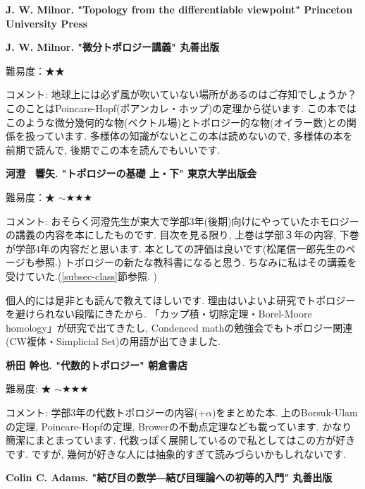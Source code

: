 \textbf{J. W. Milnor. "Topology from the differentiable viewpoint" Princeton University Press}  　\vspace{-6pt} 

\textbf{J. W. Milnor. "微分トポロジー講義" 丸善出版}  　\vspace{-6pt} 

難易度：★★ \vspace{-6pt} 

コメント: 地球上には必ず風が吹いていない場所があるのはご存知でしょうか？ このことはPoincare-Hopf(ポアンカレ・ホップ)の定理から従います. この本ではこのような微分幾何的な物(ベクトル場)とトポロジー的な物(オイラー数)との関係を扱っています. 多様体の知識がないとこの本は読めないので, 多様体の本を前期で読んで, 後期でこの本を読んでもいいです. 
\vspace{8pt}


\textbf{河澄　響矢. "トポロジーの基礎 上・下" 東京大学出版会}  　\vspace{-6pt} 

難易度：★ $\sim$★★★\vspace{-6pt} 

コメント: おそらく河澄先生が東大で学部3年(後期)向けにやっていたホモロジーの講義の内容を本にしたものです. 目次を見る限り, 上巻は学部３年の内容, 下巻が学部4年の内容だと思います. 本としての評価は良いです(松尾信一郎先生のページも参照.) トポロジーの新たな教科書になると思う. ちなみに私はその講義を受けていた.(\ref{subsec-class}節参照. )

個人的には是非とも読んで教えてほしいです. 理由はいよいよ研究でトポロジーを避けられない段階にきたから. 「カップ積・切除定理・Borel-Moore homology」が研究で出てきたし, Condenced mathの勉強会でもトポロジー関連(CW複体・Simplicial Set)の用語が出てきました. 
\vspace{8pt}

\textbf{枡田 幹也. "代数的トポロジー" 朝倉書店}  　\vspace{-6pt} 

難易度: ★ $\sim$★★★\vspace{-6pt} 

コメント: 学部3年の代数トポロジーの内容(+$\alpha$)をまとめた本. 上のBorsuk-Ulamの定理, Poincare-Hopfの定理, Browerの不動点定理なども載っています. かなり簡潔にまとまっています. 代数っぽく展開しているので私としてはこの方が好きです.  ですが, 幾何が好きな人には抽象的すぎて読みづらいかもしれないです. 
\vspace{8pt}


\textbf{Colin C. Adams. "結び目の数学―結び目理論への初等的入門" 丸善出版}  　\vspace{-6pt} 

